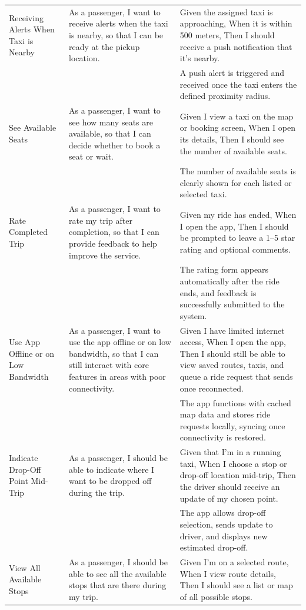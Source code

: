 \documentclass[a4paper,12pt]{article}
\begin{document}
\begin{longtable}{>{\raggedright}p{4cm} p{6cm} p{5cm}}
Receiving Alerts When Taxi is Nearby & As a passenger, I want to receive alerts when the taxi is nearby, so that I can be ready at the pickup location. & Given the assigned taxi is approaching, When it is within 500 meters, Then I should receive a push notification that it’s nearby. \\
& & A push alert is triggered and received once the taxi enters the defined proximity radius. \\ \midrule
See Available Seats & As a passenger, I want to see how many seats are available, so that I can decide whether to book a seat or wait. & Given I view a taxi on the map or booking screen, When I open its details, Then I should see the number of available seats. \\
& & The number of available seats is clearly shown for each listed or selected taxi. \\ \midrule
Rate Completed Trip & As a passenger, I want to rate my trip after completion, so that I can provide feedback to help improve the service. & Given my ride has ended, When I open the app, Then I should be prompted to leave a 1–5 star rating and optional comments. \\
& & The rating form appears automatically after the ride ends, and feedback is successfully submitted to the system. \\ \midrule
Use App Offline or on Low Bandwidth & As a passenger, I want to use the app offline or on low bandwidth, so that I can still interact with core features in areas with poor connectivity. & Given I have limited internet access, When I open the app, Then I should still be able to view saved routes, taxis, and queue a ride request that sends once reconnected. \\
& & The app functions with cached map data and stores ride requests locally, syncing once connectivity is restored. \\ \midrule
Indicate Drop-Off Point Mid-Trip & As a passenger, I should be able to indicate where I want to be dropped off during the trip. & Given that I’m in a running taxi, When I choose a stop or drop-off location mid-trip, Then the driver should receive an update of my chosen point. \\
& & The app allows drop-off selection, sends update to driver, and displays new estimated drop-off. \\ \midrule
View All Available Stops & As a passenger, I should be able to see all the available stops that are there during my trip. & Given I’m on a selected route, When I view route details, Then I should see a list or map of all possible stops. \\

\end{longtable}
\end{document}
